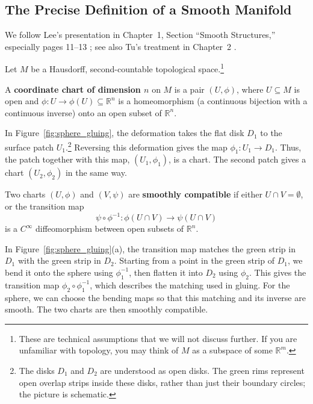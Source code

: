     \subsection{The Precise Definition of a Smooth Manifold}
    We follow Lee's presentation in Chapter~1, Section ``Smooth Structures,''
    especially pages 11--13 \cite[Chapter~1, ``Smooth Structures,'' pp.~11--
    13]{lee2013smooth}; see also Tu's treatment in Chapter~2
    \cite[Chapter~2]{tu2011introduction}.

    \begin{definition}
        Let $M$ be a Hausdorff, second-countable topological space.\footnote{%
            These are technical assumptions that we will not discuss further.
            If you are unfamiliar with topology, you may think of $M$ as a
            subspace of some $\mathbb{R}^m$.}

        A \textbf{coordinate chart of dimension $n$} on $M$ is a pair
        $(U, \phi)$, where $U \subseteq M$ is open and
        $\phi \colon U \to \phi(U) \subseteq \mathbb{R}^n$ is a homeomorphism (a continuous bijection with a
        continuous inverse) onto an open subset of $\mathbb{R}^n$.

        In Figure~\ref{fig:sphere_gluing}, the deformation takes the flat disk
        $D_1$ to the surface patch $U_1$.\footnote{%
            The disks $D_1$ and $D_2$ are understood as open disks. The green
            rims represent open overlap strips inside these disks, rather
            than just their boundary circles; the picture is schematic.}
        Reversing this deformation gives the map $\phi_1 \colon U_1 \to D_1$.
        Thus, the patch together with this map, $(U_1,\phi_1)$, is a chart.
        The second patch gives a chart $(U_2,\phi_2)$ in the same way.

        Two charts $(U, \phi)$ and $(V, \psi)$ are \textbf{smoothly
        compatible} if either $U \cap V = \emptyset$, or the transition map
        \begin{equation}
            \psi \circ \phi^{-1} \colon \phi(U \cap V) \to \psi(U \cap V)
        \end{equation}
        is a $C^\infty$ diffeomorphism between open subsets of $\mathbb{R}^n$.

        In Figure~\ref{fig:sphere_gluing}(a), the transition map matches the
        green strip in $D_1$ with the green strip in $D_2$. Starting from a
        point in the green strip of $D_1$, we bend it onto the sphere using
        $\phi_1^{-1}$, then flatten it into $D_2$ using $\phi_2$. This gives
        the transition map $\phi_2 \circ \phi_1^{-1}$, which describes the
        matching used in gluing. For the sphere, we can choose the bending
        maps so that this matching and its inverse are smooth. The two charts
        are then smoothly compatible.


\end{definition}
